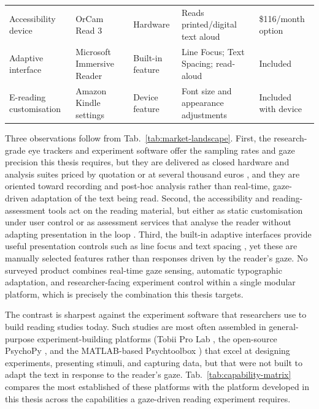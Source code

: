 \begin{longtable}{p{2.6cm}p{2.6cm}p{2.2cm}p{3.7cm}p{2.2cm}}
Accessibility device & OrCam Read 3 & Hardware & Reads printed/digital text aloud \cite{orcam2025read3} & \$116/month option \cite{orcam2025read3} \\
Adaptive interface & Microsoft Immersive Reader & Built-in feature & Line Focus; Text Spacing; read-aloud \cite{microsoft2025immersive} & Included \cite{microsoft2025immersive} \\
E-reading customisation & Amazon Kindle settings & Device feature & Font size and appearance adjustments \cite{amazon2025kindle} & Included with device \cite{amazon2025kindle} \\
\bottomrule
\end{longtable}
\endgroup

Three observations follow from Tab.~\ref{tab:market-landscape}.
First, the research-grade eye trackers and experiment software offer the sampling rates and gaze precision this thesis requires, but they are delivered as closed hardware and analysis suites priced by quotation or at several thousand euros \cite{tobii2025fusion, srresearch2025eyelink, gazepoint2025gp3, pupillabs2025neon, tobii2025prolab}, and they are oriented toward recording and post-hoc analysis rather than real-time, gaze-driven adaptation of the text being read.
Second, the accessibility and reading-assessment tools act on the reading material, but either as static customisation under user control \cite{orcam2025read3, amazon2025kindle} or as assessment services that analyse the reader without adapting presentation in the loop \cite{lexplore2025assessment}.
Third, the built-in adaptive interfaces provide useful presentation controls such as line focus and text spacing \cite{microsoft2025immersive}, yet these are manually selected features rather than responses driven by the reader's gaze.
No surveyed product combines real-time gaze sensing, automatic typographic adaptation, and researcher-facing experiment control within a single modular platform, which is precisely the combination this thesis targets.

The contrast is sharpest against the experiment software that researchers use to build reading studies today.
Such studies are most often assembled in general-purpose experiment-building platforms (Tobii Pro Lab \cite{tobii2025prolab}, the open-source PsychoPy \cite{peirce2019psychopy}, and the MATLAB-based Psychtoolbox \cite{brainard1997psychtoolbox}) that excel at designing experiments, presenting stimuli, and capturing data, but that were not built to adapt the text in response to the reader's gaze.
Tab.~\ref{tab:capability-matrix} compares the most established of these platforms with the platform developed in this thesis across the capabilities a gaze-driven reading experiment requires.

